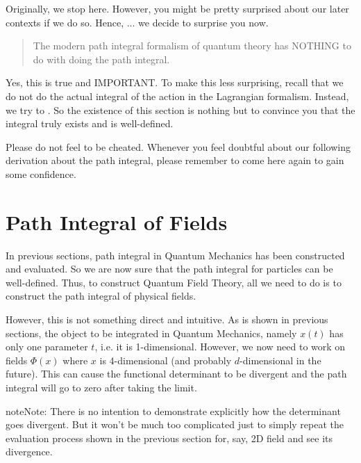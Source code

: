 \documentclass[letterpaper,10pt,english]{sphinxmanual}
\begin{document}
Originally, we stop here. However, you might be pretty surprised about our later contexts if we do so. Hence, ... we decide to surprise you now.
\begin{quote}

The modern path integral formalism of quantum theory has NOTHING to do with doing the path integral.
\end{quote}

Yes, this is true and IMPORTANT. To make this less surprising, recall that we do not do the actual integral of the action in the Lagrangian formalism. Instead, we try to . So the existence of this section is nothing but to convince you that the integral truly exists and is well-defined.

Please do not feel to be cheated. Whenever you feel doubtful about our following derivation about the path integral, please remember to come here again to gain some confidence.


\section{Path Integral of Fields}
\label{\detokenize{pi_fields:path-integral-of-fields}}\label{\detokenize{pi_fields::doc}}
In previous sections, path integral in Quantum Mechanics has been constructed and evaluated. So we are now sure that the path integral for particles can be well-defined. Thus, to construct Quantum Field Theory, all we need to do is to construct the path integral of physical fields.

However, this is not something direct and intuitive. As is shown in previous sections, the object to be integrated in Quantum Mechanics, namely \(x(t)\) has only one parameter \(t\), i.e. it is 1-dimensional. However, we now need to work on fields \(\Phi(x)\) where \(x\) is 4-dimensional (and probably \(d\)-dimensional in the future). This can cause the functional determinant to be divergent and the path integral will go to zero after taking the limit.

\begin{sphinxadmonition}{note}{Note:}
There is no intention to demonstrate explicitly how the determinant goes divergent. But it won't be much too complicated just to simply repeat the evaluation process shown in the previous section for, say, 2D field and see its divergence.
\end{sphinxadmonition}
\end{document}
